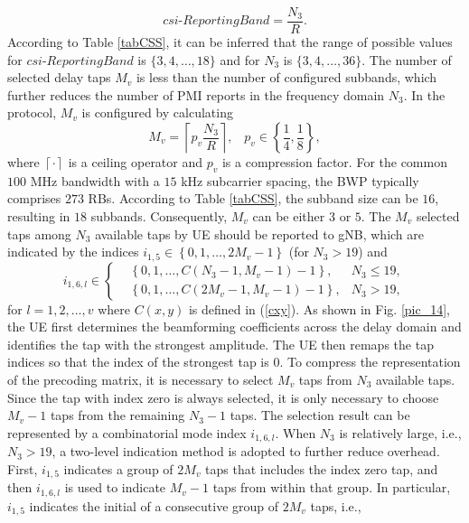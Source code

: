 \documentclass[lettersize,journal]{IEEEtran}
\begin{document}
\begin{equation}
csi\text{-}ReportingBand = \frac{{{N_3}}}{R}.
\end{equation}
According to Table \ref{tabCSS}, it can be inferred that the range of possible values for $csi\text{-}ReportingBand$ is $\{3, 4, \ldots, 18\}$ and for $N_3$ is $\{3, 4, \ldots, 36\}$. The number of selected delay taps \( M_v \) is less than the number of configured subbands, which further reduces the number of PMI reports in the frequency domain \( N_3 \). In the protocol, \( M_v \) is configured by calculating
\begin{equation}\label{c66}
 M_v  = \left\lceil {{p_v }\frac{{{N_3}}}{R}} \right\rceil, \;\;\;{p_v} \in \left\{ {\frac{1}{4},\frac{1}{8}} \right\},
\end{equation}
where $\left\lceil \cdot \right\rceil$ is a ceiling operator and ${p_v}$ is a compression factor. For the common $100$ MHz bandwidth with a $15$ kHz subcarrier spacing, the BWP typically comprises $273$ RBs. According to Table \ref{tabCSS}, the subband size can be $16$, resulting in $18$ subbands. Consequently, $M_v$ can be either $3$ or $5$. The \( M_v \) selected taps among $N_3$ available taps by UE should be reported to gNB, which are indicated by the indices ${i_{1,5}} \in \left\{ {0,1, \ldots ,2{M_v } - 1} \right\}$ (for $N_3>19$) and 
\begin{equation*}
{i_{1,6,l}} \in \left\{ {\begin{aligned}
&{\left\{ {0,1, \ldots ,C\left(N_3-1,M_v-1  \right) - 1}\right\}},&{{N_3} \le 19},\\
&{\left\{ {0,1, \ldots ,C\left(2M_v-1,M_v-1  \right) - 1} \right\}},&{{N_3} > 19},
\end{aligned}} \right.
\end{equation*}
for $l=1,2,\ldots,v$ where $C(x,y)$ is defined in (\ref{cxy}). As shown in Fig. \ref{pic_14}, the UE first determines the beamforming coefficients across the delay domain and identifies the tap with the strongest amplitude. The UE then remaps the tap indices so that the index of the strongest tap is $0$. To compress the representation of the precoding matrix, it is necessary to select \( M_v \) taps from \( N_3 \) available taps. Since the tap with index zero is always selected, it is only necessary to choose \( M_v - 1 \) taps from the remaining \( N_3 - 1 \) taps. The selection result can be represented by a combinatorial mode index \( {i_{1,6,l}} \). When \( N_3 \) is relatively large, i.e., ${N_3} > 19$, a two-level indication method is adopted to further reduce overhead. First, \( {i_{1,5}} \) indicates a group of \( 2M_v \) taps that includes the index zero tap, and then \( {i_{1,6,l}} \) is used to indicate \( M_v - 1 \) taps from within that group. In particular, \( {i_{1,5}} \) indicates the initial of a consecutive group of \( 2M_v \) taps, i.e., 
\end{document}
